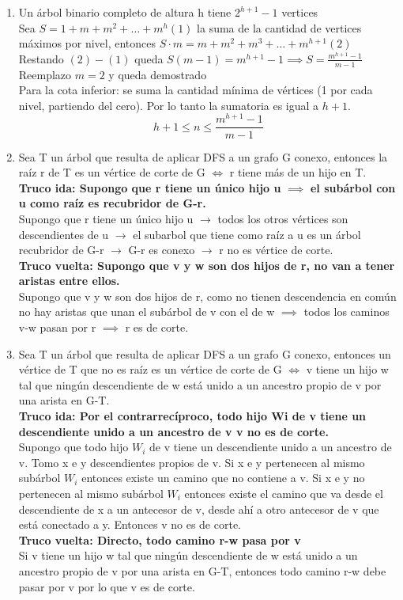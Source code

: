 \documentclass{article}
\begin{document}
\begin{enumerate}
    \item Un árbol binario completo de altura h tiene $2^{h+1}-1$ vertices \\
    Sea $S=1+m+m^2+\dots+m^h(1)$ la suma de la cantidad de vertices máximos por nivel, entonces $S\cdot m=m+m^2+m^3+\dots+m^{h+1}(2)$ \\
    Restando $(2)-(1)$ queda $S(m-1)=m^{h+1}-1 \implies S=\frac{m^{h+1}-1}{m-1}$ \\
    Reemplazo $m=2$ y queda demostrado \\
    Para la cota inferior: se suma la cantidad mínima de vértices (1 por cada nivel, partiendo del cero). Por lo tanto la sumatoria es igual a $h+1$. \\
    $$h+1\leq n \leq \frac{m^{h+1}-1}{m-1}$$
    
    \item Sea T un árbol que resulta de aplicar DFS a un grafo G conexo, entonces la raíz r de T es un vértice de corte de G $\iff$ r tiene más de un hijo en T. \\
    \textbf{Truco ida: Supongo que r tiene un único hijo u} $\implies$ \textbf{el subárbol con u como raíz es recubridor de G-r.} \\
    Supongo que r tiene un único hijo u $\rightarrow$ todos los otros vértices son descendientes de u $\rightarrow$ el subarbol que tiene como raíz a u es un árbol recubridor de G-r $\rightarrow$ G-r es conexo $\rightarrow$ r no es vértice de corte. \\
    \textbf{Truco vuelta: Supongo que v y w son dos hijos de r, no van a tener aristas entre ellos.} \\
    Supongo que v y w son dos hijos de r, como no tienen descendencia en común no hay aristas que unan el subárbol de v con el de w $\implies$ todos los caminos v-w pasan por r $\implies$ r es de corte.
    
    \item Sea T un árbol que resulta de aplicar DFS a un grafo G conexo, entonces un vértice de T que no es raíz es un vértice de corte de G $\iff$ v tiene un hijo w tal que ningún descendiente de w está unido a un ancestro propio de v por una arista en G-T. \\
    \textbf{Truco ida: Por el contrarrecíproco, todo hijo Wi de v tiene un descendiente unido a un ancestro de v  v no es de corte.} \\
    Supongo que todo hijo $W_i$ de v tiene un descendiente unido a un ancestro de v. Tomo x e y descendientes propios de v. Si x e y pertenecen al mismo subárbol $W_i$ entonces existe un camino que no contiene a v. Si x e y no pertenecen al mismo subárbol $W_i$ entonces existe el camino que va desde el descendiente de x a un antecesor de v, desde ahí a otro antecesor de v que está conectado a y. Entonces v no es de corte. \\
    \textbf{Truco vuelta: Directo, todo camino r-w pasa por v} \\
    Si v tiene un hijo w tal que ningún descendiente de w está unido a un ancestro propio de v por una arista en G-T, entonces todo camino r-w debe pasar por v por lo que v es de corte.
    

\end{enumerate}
\end{document}
